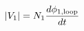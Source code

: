 \documentclass[preview]{standalone}
\begin{document}
\begin{align*}
|V_1| = N_1 {d \phi_{1,\text{loop}} \over d t}
\end{align*}
\end{document}
